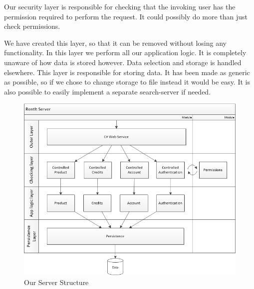 Our security layer is responsible for checking that the invoking user has the permission required to perform the request. It could possibly do more than just check permissions.

We have created this layer, so that it can be removed without losing any functionality.
In this layer we perform all our application logic. It is completely unaware of how data is stored however. Data selection and storage is handled elsewhere.
This layer is responsible for storing data. It has been made as generic as possible, so if we chose to change storage to  file instead it would be easy. It is also possible to easily implement a separate search-server if needed.

\begin{figure}[H]
  \includegraphics[width=\textwidth]{illustrations/ServerStructure.png}
  \caption{Our Server Structure}
  \label{fig:serverstructure}
\end{figure}
\newpage